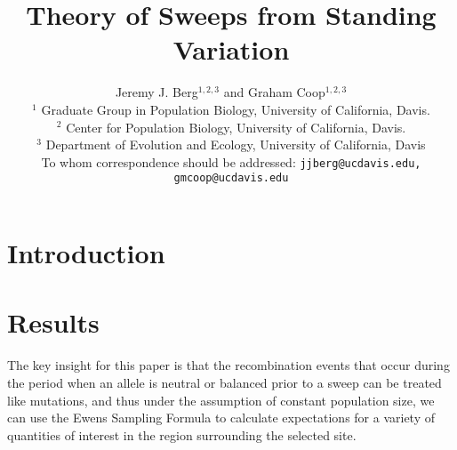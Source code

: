 \documentclass[a4paper,10pt]{article}
\title{Theory of Sweeps from Standing Variation}
\author{
Jeremy J. Berg$^{1,2,3}$ and Graham Coop$^{1,2,3}$ \\
$^1$ Graduate Group in Population Biology, University of California, Davis. \\
$^2$ Center for Population Biology, University of California, Davis.\\
$^3$ Department of Evolution and Ecology, University of California, Davis\\
\small To whom correspondence should be addressed: \texttt{jjberg@ucdavis.edu, gmcoop@ucdavis.edu}\\
}
\date{}
\begin{document}
\maketitle

\begin{abstract}
\end{abstract}

\section{Introduction}



\section{Results}

The key insight for this paper is that the recombination events that occur during the period when an allele is neutral or balanced prior to a sweep can be treated like mutations, and thus under the assumption of constant population size, we can use the Ewens Sampling Formula to calculate expectations for a variety of quantities of interest in the region surrounding the selected site.
\end{document}
